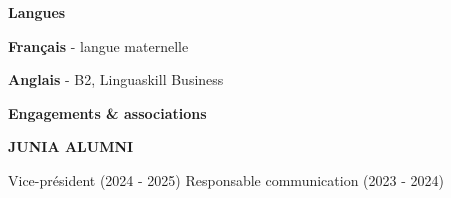 \documentclass[10pt,a4paper]{article}
\newcommand{\smallsection}[2]{%
  \vspace{9pt}
  {\fontsize{8.9pt}{10.45pt}\selectfont\bfseries\color{accentdark}%
  {\scriptsize\color{accent}#1}\hspace{3.5pt}#2}\par
  \vspace{3.2pt}
}
\newlength{\maincolumnheight}
\begin{document}
\begin{minipage}[t]{0.285\textwidth}
{\begin{minipage}[t][\maincolumnheight][t]{0.91\linewidth}
  \smallsection{}{Langues}
  \textbf{Français} - langue maternelle\par
  \textbf{Anglais} - B2, Linguaskill Business\par

  \smallsection{}{Engagements \& associations}
  \textbf{JUNIA ALUMNI}\par
  {\color{muted}Vice-président (2024 - 2025) \textbullet{} Responsable communication (2023 - 2024)}\par
  \vspace{3pt}
  \end{minipage}
}

\end{minipage}
\hfill
\usebox{\maincolumnbox}
\end{document}
